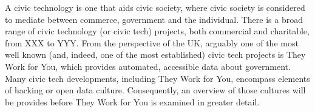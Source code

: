 A civic technology is one that aids civic society, where civic society is considered to mediate between commerce, government and the individual.
There is a broad range of civic technology (or civic tech) projects, both commercial and charitable, from XXX to YYY. From the perspective of the UK, arguably one of the most well known (and, indeed, one of the most established) civic tech projects is They Work for You, which provides automated, accessible data about government. Many civic tech developments, including They Work for You, encompass elements of hacking or open data culture. Consequently, an overview of those cultures will be provides before They Work for You is examined in greater detail.